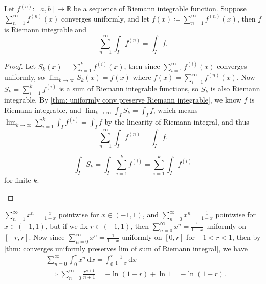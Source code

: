 \begin{theorem} \label{thm: converges uniformly preserves lim of sum of Riemann integral}
    Let \(f^{(n)}: [a, b] \to \mathbb{R} \) be a sequence of Riemann integrable function. Suppose \(\sum_{n=1}^{\infty} f^{(n)}(x) \) converges uniformly, and let \(f(x) \coloneqq \sum_{n=1}^{\infty} f^{(n)}(x) \), then \(f\) is Riemann integrable and 
    \[
        \sum_{n=1}^{\infty} \int _I f^{(n)} = \int _I f.
    \]  
\end{theorem}
\begin{proof}
    Let \(S_k(x) = \sum_{i=1}^k f^{(i)}(x) \), then since \(\sum_{i=1}^{\infty} f^{(i)}(x) \) converges uniformly, so \(\lim_{k \to \infty} S_k(x) = f(x) \) where \(f(x) = \sum_{i=1}^{\infty} f^{(n)}(x) \). Now \(S_k = \sum_{i=1}^k f^{(i)} \) is a sum of Riemann integrable functions, so \(S_k\) is also Riemann integrable. By \autoref{thm: uniformly conv preserve Riemann integrable}, we know \(f\) is Riemann integrable, and \(\lim_{k \to \infty} \int _I S_k = \int _I f \), which means \(\lim_{k \to \infty} \sum_{i=1}^k \int _I f^{(i)} = \int _I f  \) by the linearity of Riemann integral, and thus 
    \[
        \sum_{n=1}^{\infty} \int _I f^{(n)} = \int _I f. 
    \] 
    \begin{note}
        \[
            \int _I S_k = \int _I \sum_{i=1}^k f^{(i)} = \sum_{i=1}^k \int _I f^{(i)}  
        \]
        for finite \(k\). 
    \end{note}          
\end{proof}

\begin{eg}
    \(\sum_{n=1}^{\infty} x^n = \frac{x}{1-x} \) pointwise for \(x \in (-1, 1)\), and \(\sum_{n=0}^{\infty} x^n = \frac{1}{1-x} \) pointwise for \(x \in (-1, 1)\), but if we fix \(r \in (-1, 1)\), then \(\sum_{n=0}^{\infty} x^n = \frac{1}{1-x} \) uniformly on \([-r, r]\). Now since \(\sum_{n=0}^{\infty} x^n = \frac{1}{1-x} \) uniformly on \([0, r]\) for \(-1 < r < 1\), then by \autoref{thm: converges uniformly preserves lim of sum of Riemann integral}, we have 
    \begin{align*}
        &\sum_{n=0}^{\infty} \int _0^r x^n \, \mathrm{d} x = \int _0^r \frac{1}{1-x} \, \mathrm{d} x \\
        &\implies \sum_{n=0}^{\infty} \frac{r^{n+1}}{n+1} = - \ln (1 - r) + \ln 1 = -\ln (1 - r).    
    \end{align*}           
\end{eg}

